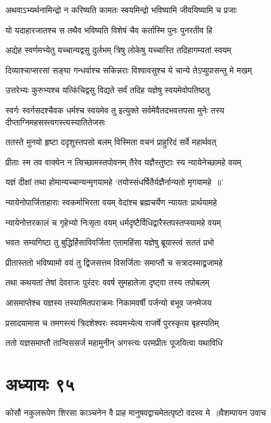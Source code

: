 \twolineshloka
{अथवाऽभ्यर्थनामिन्द्रो न करिष्यति कामतः}
{स्वयमिन्द्रो भविष्यामि जीवयिष्यामि च प्रजाः}


\twolineshloka
{यो यदाहारजातश्च स तथैव भविष्यति}
{विशेषं चैव कर्तास्मि पुनः पुनरतीव हि}


\twolineshloka
{अद्येह स्वर्णमभ्येतु यच्चान्यद्वसु दुर्लभम्}
{त्रिषु लोकेषु यच्चास्ति तदिहागम्यतां स्वयम्}


\twolineshloka
{दिव्याश्चाप्सरसां सङ्घा गन्धर्वाश्च सकिन्नराः}
{विश्वावसुश्च ये चान्ये तेऽप्युपासन्तु मे मखम्}


\twolineshloka
{उत्तरेभ्यः कुरुभ्यश्च यत्किंचिद्वसु विद्यते}
{सर्वं तदिह यज्ञेषु स्वयमेवोपतिष्ठतु}


\threelineshloka
{स्वर्गः स्वर्गसदश्चैवक धर्मश्च स्वयमेव तु}
{इत्युक्ते सर्वमेवैतदभवत्तपसा मुनेः}
{तस्य दीप्ताग्निमहसस्त्वगस्त्यस्यातितेजसः}


\twolineshloka
{ततस्ते मुनयो हृष्टा ददृशुस्तपसो बलम्}
{विस्मिता वचनं प्राहुरिदं सर्वे महार्थवत्}


\twolineshloka
{प्रीताः स्म तव वाक्येन न त्विच्छामस्तपोवनम्}
{तैरेव यज्ञैस्तुष्टाः स्य न्यायेनेच्छामहे वयम्}


\twolineshloka
{यज्ञं दीक्षां तथा होमान्यच्चान्यन्मृगयामहे}
{`तयोस्संधर्षितैर्यज्ञैर्नान्यतो मृगयामहे ॥'}


\twolineshloka
{न्यायेनोपार्जिताहाराः स्वकर्माभिरता वयम्}
{वेदांश्च ब्रह्मचर्येण न्यायतः प्रार्थयामहे}


\twolineshloka
{न्यायेनोत्तरकालं च गृहेभ्यो निःसृता वयम्}
{धर्मदृष्टैर्विधिद्वारैस्तपस्तप्स्यामहे वयम्}


\twolineshloka
{भवतः सम्यगिष्टा तु बुद्धिर्हिसाविवर्जिता}
{एतामहिंसा यज्ञेषु ब्रूयास्त्वं सततं प्रभो}


\twolineshloka
{प्रीतास्ततो भविष्यामो वयं तु द्विजसत्तम}
{विसर्जिताः समाप्तौ च सत्रादस्माद्व्रजामहे}


\twolineshloka
{तथा कथयतां तेषां देवराजः पुरंदरः}
{ववर्ष सुमहातेजा दृष्ट्वा तस्य तपोबलम्}


\twolineshloka
{आसमाप्तेश्च यज्ञस्य तस्यामितपराक्रमः}
{निकामवर्षी पर्जन्यो बभूव जनमेजय}


\twolineshloka
{प्रसादयामास च तमगस्त्यं त्रिदशेश्वरः}
{स्वयमभ्येत्य राजर्षे पुरस्कृत्य बृहस्पतिम्}


\twolineshloka
{ततो यज्ञसमाप्तौ तान्विससर्ज महामुनीन्}
{अगस्त्यः परमप्रीतः पूजयित्वा यथाविधि}


\chapter{अध्यायः ९५}
\threelineshloka
{कोसौ नकुलरूपेण शिरसा काञ्चनेन वै}
{प्राह मानुषवद्वाचमेतत्पृष्टो वदस्व मे ॥वैशम्पायन उवाच}
{}


